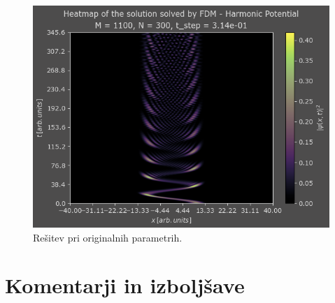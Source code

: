\documentclass[a4paper]{article}
\begin{document}
\begin{figure}[H]
    \centering
    \includegraphics[width=\textwidth]{./images/case1_org.png}
    \caption*{Rešitev pri originalnih parametrih.}
    \label{fig:harmonic_oscillator_org}
\end{figure}




\section{Komentarji in izboljšave}


\newpage


\end{document}
